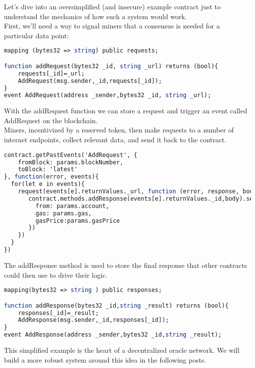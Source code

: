 \documentclass[a4paper,10pt]{article}
\begin{document}
Let’s dive into an oversimplified (and insecure) example contract just to understand the mechanics of how such a system would work.\\

First, we’ll need a way to signal miners that a consensus is needed for a particular data point:\\

\begin{lstlisting}[language=Scilab]
mapping (bytes32 => string) public requests;

function addRequest(bytes32 _id, string _url) returns (bool){
    requests[_id]=_url;
    AddRequest(msg.sender,_id,requests[_id]);
}
event AddRequest(address _sender,bytes32 _id, string _url);
\end{lstlisting}

With the addRequest function we can store a request and trigger an event called AddRequest on the blockchain.\\

Miners, incentivized by a reserved token, then make requests to a number of internet endpoints, collect relevant data, and send it back to the contract.\\

\begin{lstlisting}[language=Scilab]
contract.getPastEvents('AddRequest', {
    fromBlock: params.blockNumber,
    toBlock: 'latest'
}, function(error, events){
  for(let e in events){
    request(events[e].returnValues._url, function (error, response, body) {
       contract.methods.addResponse(events[e].returnValues._id,body).send({
         from: params.account,
         gas: params.gas,
         gasPrice:params.gasPrice
       })
    })
  }
})
\end{lstlisting}

The addResponse method is used to store the final response that other contracts could then use to drive their logic.\\

\begin{lstlisting}[language=Scilab]
mapping(bytes32 => string ) public responses;

function addResponse(bytes32 _id,string _result) returns (bool){
    responses[_id]=_result;
    AddResponse(msg.sender,_id,responses[_id]);
}
event AddResponse(address _sender,bytes32 _id,string _result);
\end{lstlisting}

This simplified example is the heart of a decentralized oracle network. We will build a more robust system around this idea in the following posts.\\
\end{document}
